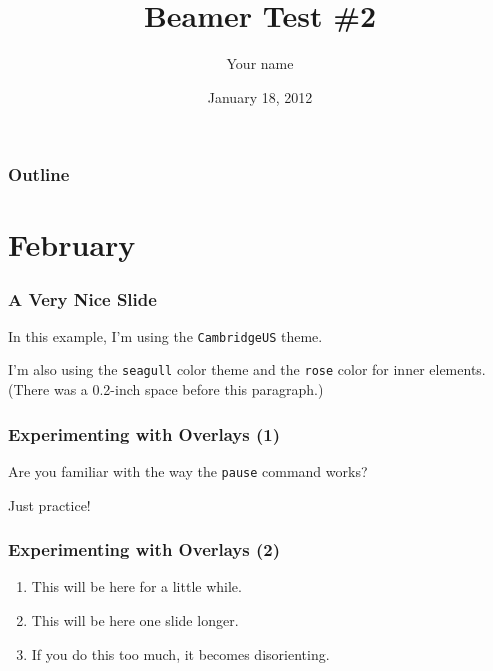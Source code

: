 \documentclass{beamer}
\title{Beamer Test \#2}
\author{Your name}
\institute{W\&J College}
\date{January 18, 2012}
\begin{document}
\begin{frame}
  \titlepage
\end{frame}

\begin{frame}
  \frametitle{Outline}
  \tableofcontents
\end{frame}

\section{February}

\begin{frame}
  \frametitle{A Very Nice Slide}
In this example, I'm using the \texttt{CambridgeUS} theme. \pause

\vspace{.2in}

I'm also using the \texttt{seagull} color theme and the \texttt{rose} color for inner elements.  (There
was a 0.2-inch space before this paragraph.)
\end{frame}

\begin{frame}
\frametitle{Experimenting with Overlays (1)}

Are you familiar with the way the \texttt{pause} \pause command works?

 \pause

Just practice!

\end{frame}

\begin{frame}
\frametitle{Experimenting with Overlays (2)}

\begin{enumerate}
\item<1-2> This will be here for a little while.
\item<2-3> This will be here one slide longer.
\item<4> If you do this too much, it becomes disorienting.
\end{enumerate}

%
\end{frame}
\end{document}
